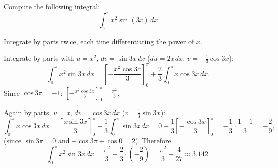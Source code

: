 
\begin{question}
Compute the following integral:
\[ \int_0^\pi x^2\sin(3x)\,dx \]
\end{question}

\begin{hint}
Integrate by parts twice, each time differentiating the power of $x$.
\end{hint}

\begin{solution}
Integrate by parts with $u=x^2$, $dv=\sin3x\,dx$ ($du=2x\,dx$, $v=-\frac13\cos3x$):
\[ \int_0^\pi x^2\sin3x\,dx=\left[-\frac{x^2\cos3x}{3}\right]_0^\pi+\frac23\int_0^\pi x\cos3x\,dx. \]
Since $\cos3\pi=-1$: $\left[-\frac{x^2\cos3x}{3}\right]_0^\pi=\frac{\pi^2}{3}$.

Again by parts, $u=x$, $dv=\cos3x\,dx$ ($v=\frac13\sin3x$):
\[ \int_0^\pi x\cos3x\,dx=\left[\frac{x\sin3x}{3}\right]_0^\pi-\frac13\int_0^\pi\sin3x\,dx=0-\frac13\left[-\frac{\cos3x}{3}\right]_0^\pi=-\frac13\cdot\frac{1+1}{3}=-\frac29, \]
(since $\sin3\pi=0$ and $-\cos3\pi+\cos0=2$). Therefore
\[ \int_0^\pi x^2\sin3x\,dx=\frac{\pi^2}{3}+\frac23\cdot\left(-\frac29\right)=\frac{\pi^2}{3}-\frac{4}{27}\approx3.142. \]
\end{solution}

